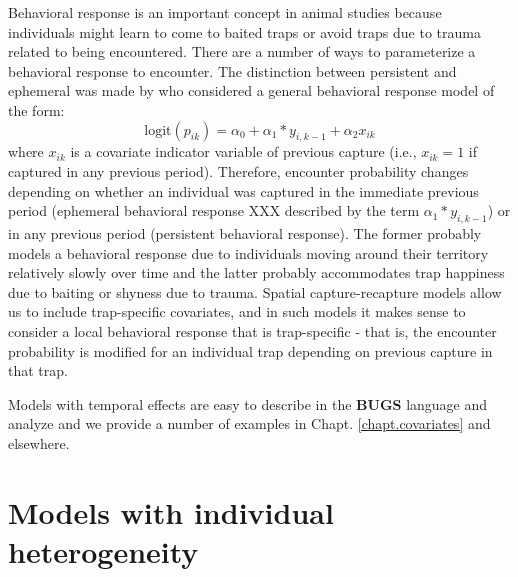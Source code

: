 Behavioral response is an important concept in animal studies
because individuals might learn to come to baited traps or avoid traps
due to trauma related to being encountered.  There are a number of
ways to parameterize a behavioral response to encounter. The
distinction between persistent and ephemeral was made by
\citet{yang_chao:2005} who considered a general behavioral response
model of the form:
\[
\mbox{logit}(p_{ik}) = \alpha_{0} + \alpha_{1}*y_{i,k-1} + \alpha_{2} x_{ik}
\]
where $x_{ik}$ is a covariate indicator variable of previous capture
(i.e., $x_{ik} = 1$ if captured in any previous period). Therefore,
encounter probability changes depending on whether an individual was
captured in the immediate previous period (ephemeral behavioral
response XXX described by the term $\alpha_{1}*y_{i,k-1}$) or in any previous period (persistent behavioral
response). The former probably models a behavioral response due to
individuals moving around their territory relatively slowly over time
and the latter probably accommodates trap happiness due to baiting or
shyness due to trauma.  Spatial capture-recapture models allow us to 
include trap-specific covariates, and in such models it makes
sense to consider a local behavioral response that is trap-specific
\citep{royle_etal:2011jwm} - that is, the encounter probability is
modified for an individual trap depending on previous capture in
that trap.

Models with temporal effects are easy to describe in the {\bf BUGS} language
and analyze and we provide a number of examples in
Chapt. \ref{chapt.covariates} and elsewhere. 


\section{ Models with individual heterogeneity}
\label{closed.sec.modelmh}


